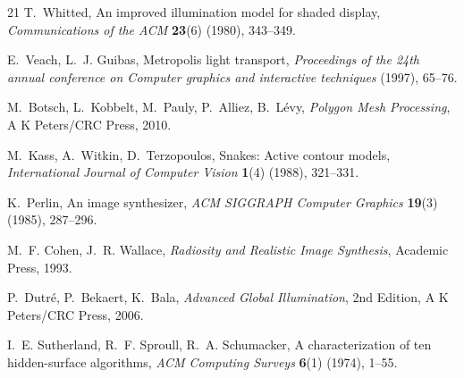 ﻿\documentclass[a4paper,12pt]{article}
\theoremstyle{definition}
\begin{document}
\begin{thebibliography}{21}
	T.~Whitted,
	An improved illumination model for shaded display,
	\emph{Communications of the ACM} \textbf{23}(6) (1980), 343--349.
	
	E.~Veach, L.~J. Guibas,
	Metropolis light transport,
	\emph{Proceedings of the 24th annual conference on Computer graphics and interactive techniques} (1997), 65--76.
	
	M.~Botsch, L.~Kobbelt, M.~Pauly, P.~Alliez, B.~Lévy,
	\emph{Polygon Mesh Processing},
	A K Peters/CRC Press, 2010.
	
	M.~Kass, A.~Witkin, D.~Terzopoulos,
	Snakes: Active contour models,
	\emph{International Journal of Computer Vision} \textbf{1}(4) (1988), 321--331.
	
	K.~Perlin,
	An image synthesizer,
	\emph{ACM SIGGRAPH Computer Graphics} \textbf{19}(3) (1985), 287--296.
	
	M.~F. Cohen, J.~R. Wallace,
	\emph{Radiosity and Realistic Image Synthesis},
	Academic Press, 1993.
	
	P.~Dutré, P.~Bekaert, K.~Bala,
	\emph{Advanced Global Illumination},
	2nd Edition, A K Peters/CRC Press, 2006.
	
	I.~E. Sutherland, R.~F. Sproull, R.~A. Schumacker,
	A characterization of ten hidden-surface algorithms,
	\emph{ACM Computing Surveys} \textbf{6}(1) (1974), 1--55.
	
\end{thebibliography}
\end{document}
